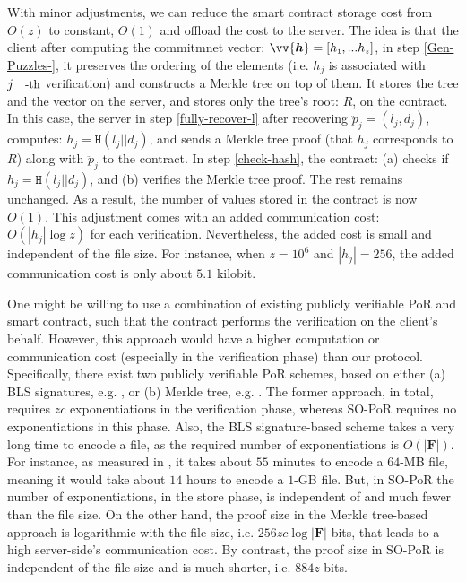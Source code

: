 \begin{remark}
With minor adjustments, we can reduce the smart contract storage cost from $O(z)$ to constant, $O(1)$ and offload the cost to the server. The idea is that the client after computing the commitmnet vector: $\vv{\bm{h}}=[h_{\scriptscriptstyle 1},...h_{\scriptscriptstyle z}]$,  in step \ref{Gen-Puzzles-}, it preserves the ordering of the elements (i.e. $h_{\scriptscriptstyle j}$ is associated with $j\text{\small{-th}}$ verification) and constructs a  Merkle tree  on top of them. It stores the tree and the vector on the server, and stores only the tree's  root: $R$, on the contract. In this case,  the server in step \ref{fully-recover-l} after recovering $\ddot{p}_{\scriptscriptstyle j}= (l_{\scriptscriptstyle j}, d_{\scriptscriptstyle j})$,  computes: $h_{\scriptscriptstyle j}=\mathtt{H}(l_{\scriptscriptstyle j}||d_{\scriptscriptstyle j})$, and sends a Merkle tree proof (that $h_{\scriptscriptstyle j}$ corresponds to  $R$) along with $\ddot{p}_{\scriptscriptstyle j}$ to the contract. In step \ref{check-hash}, the contract: (a) checks if $h_{\scriptscriptstyle j}=\mathtt{H}(l_{\scriptscriptstyle j}||d_{\scriptscriptstyle j})$, and  (b) verifies the Merkle tree proof.  The rest  remains unchanged.  As a result, the number of values stored in the contract is now $O(1)$. This adjustment comes with an added communication cost: $O(|h_{\scriptscriptstyle j}|\log z)$ for each verification. Nevertheless, the added cost is small and independent of the file size.   For instance, when  $z=10^{\scriptscriptstyle 6}$ and $|h_{\scriptscriptstyle j}|=256$, the  added communication cost is only about $5.1$ kilobit.

\end{remark}

\begin{remark}
One might be willing to use a combination of existing publicly verifiable PoR and smart contract, such that the contract performs the verification on the client's behalf. However, this approach would have a higher computation or communication cost (especially in the verification phase) than our protocol. Specifically,  there exist two publicly verifiable PoR schemes, based on either (a) BLS signatures, e.g. \cite{DBLP:conf/asiacrypt/ShachamW08}, or (b) Merkle tree, e.g. \cite{MillerPermacoin}. The former approach, in total, requires  $zc$ exponentiations in the verification phase, whereas SO-PoR requires no exponentiations in this phase. Also, the BLS signature-based scheme takes a very long time to encode  a file, as the required number of exponentiations is  $O(|{\bm{F}}|)$. For instance, as measured in \cite{armknecht2014outsourced}, it takes about $55$ minutes to encode a  $64$-MB file,  meaning  it would take about $14$ hours to encode a $1$-GB file. But, in SO-PoR the number of exponentiations, in the store phase, is independent of and much fewer than the file size. On the other hand, the proof size in the Merkle tree-based approach is logarithmic with the file size, i.e. $256zc\log |{\bm{F}}|$ bits, that leads to a high server-side's communication cost. By contrast,  the proof size in SO-PoR is  independent of the file size and is much shorter, i.e. $884z$ bits. 


\end{remark}

